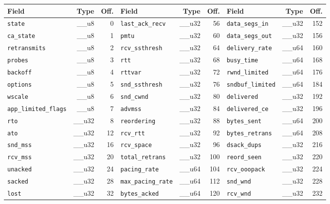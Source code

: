\documentclass[10pt]{article}
\begin{document}
\begin{center}\scriptsize
\begin{tabular}{@{}lrr@{\hspace{14pt}}lrr@{\hspace{14pt}}lrr@{}}
\toprule
Field & Type & Off. & Field & Type & Off. & Field & Type & Off. \\
\midrule
\texttt{state} & \_\_u8 & 0 & \texttt{last\_ack\_recv} & \_\_u32 & 56 & \texttt{data\_segs\_in} & \_\_u32 & 152 \\
\texttt{ca\_state} & \_\_u8 & 1 & \texttt{pmtu} & \_\_u32 & 60 & \texttt{data\_segs\_out} & \_\_u32 & 156 \\
\texttt{retransmits} & \_\_u8 & 2 & \texttt{rcv\_ssthresh} & \_\_u32 & 64 & \texttt{delivery\_rate} & \_\_u64 & 160 \\
\texttt{probes} & \_\_u8 & 3 & \texttt{rtt} & \_\_u32 & 68 & \texttt{busy\_time} & \_\_u64 & 168 \\
\texttt{backoff} & \_\_u8 & 4 & \texttt{rttvar} & \_\_u32 & 72 & \texttt{rwnd\_limited} & \_\_u64 & 176 \\
\texttt{options} & \_\_u8 & 5 & \texttt{snd\_ssthresh} & \_\_u32 & 76 & \texttt{sndbuf\_limited} & \_\_u64 & 184 \\
\texttt{wscale} & \_\_u8 & 6 & \texttt{snd\_cwnd} & \_\_u32 & 80 & \texttt{delivered} & \_\_u32 & 192 \\
\texttt{app\_limited\_flags} & \_\_u8 & 7 & \texttt{advmss} & \_\_u32 & 84 & \texttt{delivered\_ce} & \_\_u32 & 196 \\
\texttt{rto} & \_\_u32 & 8 & \texttt{reordering} & \_\_u32 & 88 & \texttt{bytes\_sent} & \_\_u64 & 200 \\
\texttt{ato} & \_\_u32 & 12 & \texttt{rcv\_rtt} & \_\_u32 & 92 & \texttt{bytes\_retrans} & \_\_u64 & 208 \\
\texttt{snd\_mss} & \_\_u32 & 16 & \texttt{rcv\_space} & \_\_u32 & 96 & \texttt{dsack\_dups} & \_\_u32 & 216 \\
\texttt{rcv\_mss} & \_\_u32 & 20 & \texttt{total\_retrans} & \_\_u32 & 100 & \texttt{reord\_seen} & \_\_u32 & 220 \\
\texttt{unacked} & \_\_u32 & 24 & \texttt{pacing\_rate} & \_\_u64 & 104 & \texttt{rcv\_ooopack} & \_\_u32 & 224 \\
\texttt{sacked} & \_\_u32 & 28 & \texttt{max\_pacing\_rate} & \_\_u64 & 112 & \texttt{snd\_wnd} & \_\_u32 & 228 \\
\texttt{lost} & \_\_u32 & 32 & \texttt{bytes\_acked} & \_\_u64 & 120 & \texttt{rcv\_wnd} & \_\_u32 & 232 \\

\end{tabular}
\end{center}
\end{document}
